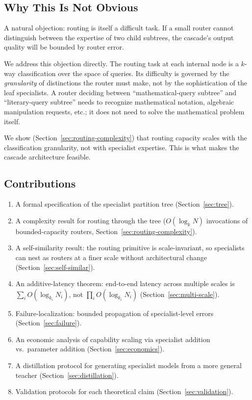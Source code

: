 \documentclass[11pt,twocolumn,a4paper]{article}
\theoremstyle{definition}
\theoremstyle{remark}
\begin{document}
\subsection{Why This Is Not Obvious}

A natural objection: routing is itself a difficult task. If a small router cannot distinguish between the expertise of two child subtrees, the cascade's output quality will be bounded by router error.

We address this objection directly. The routing task at each internal node is a $k$-way classification over the space of queries. Its difficulty is governed by the \emph{granularity} of distinctions the router must make, not by the sophistication of the leaf specialists. A router deciding between ``mathematical-query subtree'' and ``literary-query subtree'' needs to recognize mathematical notation, algebraic manipulation requests, etc.; it does not need to solve the mathematical problem itself.

We show (Section~\ref{sec:routing-complexity}) that routing capacity scales with the classification granularity, not with specialist expertise. This is what makes the cascade architecture feasible.

\subsection{Contributions}

\begin{enumerate}
    \item A formal specification of the specialist partition tree (Section~\ref{sec:tree}).
    \item A complexity result for routing through the tree ($O(\log_k N)$ invocations of bounded-capacity routers, Section~\ref{sec:routing-complexity}).
    \item A self-similarity result: the routing primitive is scale-invariant, so specialists can nest as routers at a finer scale without architectural change (Section~\ref{sec:self-similar}).
    \item An additive-latency theorem: end-to-end latency across multiple scales is $\sum_i O(\log_{k_i} N_i)$, not $\prod_i O(\log_{k_i} N_i)$ (Section~\ref{sec:multi-scale}).
    \item Failure-localization: bounded propagation of specialist-level errors (Section~\ref{sec:failure}).
    \item An economic analysis of capability scaling via specialist addition vs.\ parameter addition (Section~\ref{sec:economics}).
    \item A distillation protocol for generating specialist models from a more general teacher (Section~\ref{sec:distillation}).
    \item Validation protocols for each theoretical claim (Section~\ref{sec:validation}).
\end{enumerate}
\end{document}
